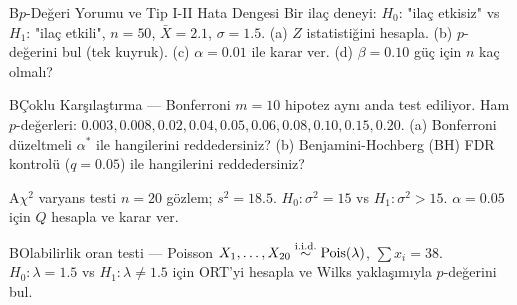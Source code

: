 \begin{alistirma}[Al.14.2b]{B}{$p$-Değeri Yorumu ve Tip I-II Hata Dengesi}
Bir ilaç deneyi: $H_0$: "ilaç etkisiz" vs $H_1$: "ilaç etkili", $n=50$, $\bar X=2.1$, $\sigma=1.5$. (a) $Z$ istatistiğini hesapla. (b) $p$-değerini bul (tek kuyruk). (c) $\alpha=0.01$ ile karar ver. (d) $\beta=0.10$ güç için $n$ kaç olmalı?
\end{alistirma}

\begin{alistirma}[Al.14.2c]{B}{Çoklu Karşılaştırma --- Bonferroni}
$m=10$ hipotez aynı anda test ediliyor. Ham $p$-değerleri: $0.003, 0.008, 0.02, 0.04, 0.05, 0.06, 0.08, 0.10, 0.15, 0.20$. (a) Bonferroni düzeltmeli $\alpha^*$ ile hangilerini reddedersiniz? (b) Benjamini-Hochberg (BH) FDR kontrolü ($q=0.05$) ile hangilerini reddedersiniz?
\end{alistirma}


\begin{alistirma}[Al.14.3]{A}{$\chi^2$ varyans testi}
$n=20$ gözlem; $s^2=18.5$. $H_0:\sigma^2=15$ vs $H_1:\sigma^2>15$. $\alpha=0.05$ için $Q$ hesapla ve karar ver.
\end{alistirma}
\begin{alistirma}[Al.14.4]{B}{Olabilirlik oran testi --- Poisson}
$X_1,\ldots,X_{20}\overset{\text{i.i.d.}}{\sim}\operatorname{Pois}(\lambda)$, $\sum x_i=38$. $H_0:\lambda=1.5$ vs $H_1:\lambda\neq1.5$ için ORT'yi hesapla ve Wilks yaklaşımıyla $p$-değerini bul.
\end{alistirma}
\alistirmalar



